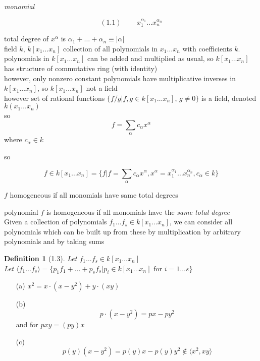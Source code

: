 \documentclass[10pt]{amsart}
\newtheorem{definition}{Definition}
\newcommand{\exercisehead}[1]
  { \smallskip
   \noindent{\small\bf Exercise #1.}
  }
\begin{document}
\begin{multicols*}{2}
\emph{monomial } 

\begin{equation}
  (1.1) \quad \quad \, x_1^{\alpha_1} \dots x_n^{\alpha_n}
\end{equation}

total degree of $x^{\alpha}$ is $\alpha_1 + \dots + \alpha_n \equiv |\alpha|$ \\



field $k$, $k[x_1 \dots x_n]$ collection of all polynomials in $x_1 \dots x_n$ with coefficients $k$.   \\

polynomials in $k[x_1 \dots x_n]$ can be added and multiplied as usual, so $k[x_1 \dots x_n]$ has structure of commutative ring (with identity) \\
however, only nonzero constant polynomials have multiplicative inverses in $k[x_1 \dots x_n]$, so $k[x_1 \dots x_n]$ not a field \\
\quad however set of rational functions $\lbrace f/g | f,g \in k[x_1 \dots x_n], \, g\neq 0\rbrace$ is a field, denoted $k(x_1 \dots x_n)$ \\

so
\[
f = \sum_{\alpha} c_{\alpha}x^{\alpha}
\]
where $c_{\alpha} \in k$

so

\[
f \in k [x_1 \dots x_n ] = \lbrace f | f = \sum_{\alpha} c_{\alpha} x^{\alpha} , x^{\alpha} = x_1^{\alpha_1} \dots x_n^{\alpha_n}, c_{\alpha} \in k \rbrace
\]

$f$ homogeneous if all monomials have same total degrees

polynomial $f$ is homogeneous if all monomials have the \emph{same total degree} \\

Given a collection of polynomials $f_1 \dots f_s \in k[x_1 \dots x_n]$, we can consider all polynomials which can be built up from these by multiplication by arbitrary polynomials and by taking sums

\begin{definition}[1.3] Let $f_1 \dots f_s \in k[x_1 \dots x_n]$ \\
Let $\langle f_1 \dots f_s \rangle = \lbrace p_1 f_1  + \dots + p_s f_s | p_i \in k[x_1 \dots x_n] \text{ for } i = 1 \dots s \rbrace$
\end{definition}


\exercisehead{1} 
\begin{enumerate}
\item[(a)] $x^2 = x \cdot ( x  -y^2 ) + y \cdot ( xy )$  
\item[(b)] 
\[
 p \cdot ( x - y^2 ) = p x - p y^2
\]
and for $p xy = (py)x$
\item[(c)] 
\[
p(y) ( x - y^2) = p(y)x - p(y) y^2 \notin \langle x^2, xy \rangle
\]
\end{enumerate}


\end{multicols*}
\end{document}
